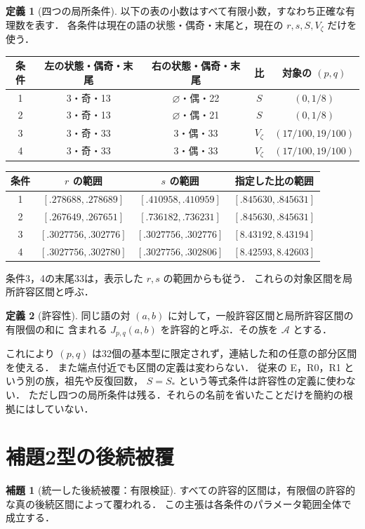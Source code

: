 \documentclass[10pt,a4paper]{article}
\theoremstyle{definition}
\newtheorem{definition}{定義}
\newtheorem{lemma}{補題}
\newcommand{\eps}{\varnothing}
\newcommand{\A}{\mathcal A}
\begin{document}
\begin{definition}[四つの局所条件]\label{def:local}
以下の表の小数はすべて有限小数，すなわち正確な有理数を表す．
各条件は現在の語の状態・偶奇・末尾と，現在の $r,s,S,V_\zeta$ だけを使う．
\begin{center}\small
\begin{tabular}{ccccc}
\toprule
条件 & 左の状態・偶奇・末尾 & 右の状態・偶奇・末尾 & 比 & 対象の $(p,q)$\\
\midrule
1 & $3$・奇・13 & $\eps$・偶・22 & $S$ & $(0,1/8)$\\
2 & $3$・奇・13 & $\eps$・偶・21 & $S$ & $(0,1/8)$\\
3 & $3$・奇・33 & $3$・偶・33 & $V_\zeta$ & $(17/100,19/100)$\\
4 & $3$・奇・33 & $3$・偶・33 & $V_\zeta$ & $(17/100,19/100)$\\
\bottomrule
\end{tabular}

\medskip\scriptsize
\begin{tabular}{cccc}
\toprule
条件 & $r$ の範囲 & $s$ の範囲 & 指定した比の範囲\\
\midrule
1 & $[.278688,.278689]$ & $[.410958,.410959]$ & $[.845630,.845631]$\\
2 & $[.267649,.267651]$ & $[.736182,.736231]$ & $[.845630,.845631]$\\
3 & $[.3027756,.302776]$ & $[.3027756,.302776]$ & $[8.43192,8.43194]$\\
4 & $[.3027756,.302780]$ & $[.3027756,.302806]$ & $[8.42593,8.42603]$\\
\bottomrule
\end{tabular}
\end{center}
条件3，4の末尾33は，表示した $r,s$ の範囲からも従う．
これらの対象区間を局所許容区間と呼ぶ．
\end{definition}

\begin{definition}[許容性]\label{def:admissible}
同じ語の対 $(a,b)$ に対して，一般許容区間と局所許容区間の有限個の和に
含まれる $J_{p,q}(a,b)$ を許容的と呼ぶ．その族を $\A$ とする．
\end{definition}

これにより $(p,q)$ は32個の基本型に限定されず，連結した和の任意の部分区間を使える．
また端点付近でも区間の定義は変わらない．
従来の E，R0，R1 という別の族，祖先や反復回数，
$S=S_*$ という等式条件は許容性の定義に使わない．
ただし四つの局所条件は残る．それらの名前を省いたことだけを簡約の根拠にはしていない．

\section{補題2型の後続被覆}
\begin{lemma}[統一した後続被覆：有限検証]\label{lem:lem2}
すべての許容的区間は，有限個の許容的な真の後続区間によって覆われる．
この主張は各条件のパラメータ範囲全体で成立する．
\end{lemma}
\end{document}
